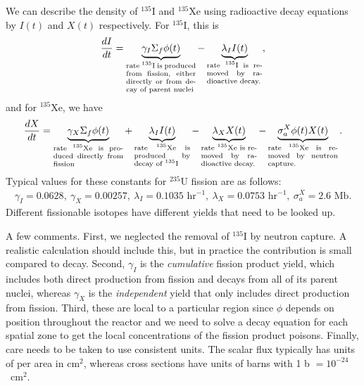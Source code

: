 We can describe the density of $^{135}$I and $^{135}$Xe using radioactive decay equations by $I(t)$ and $X(t)$ respectively. For $^{135}$I, this is
\begin{align}
  \frac{dI}{dt} = 
  \underbrace{\gamma_I \Sigma_f \phi(t)}_{\parbox{2.5cm}{\scriptsize rate $^{135}$I is produced from fission, either directly or from decay of parent nuclei}} 
  - \underbrace{\lambda_I I(t)}_{\parbox{2cm}{\scriptsize rate $^{135}$I is removed by radioactive decay.}}  ,
\end{align}
and for $^{135}$Xe, we have
\begin{align}
  \frac{dX}{dt} = 
  \underbrace{\gamma_X \Sigma_f \phi(t)}_{\parbox{2.5cm}{\scriptsize rate $^{135}$Xe is produced directly from fission}}
  + \underbrace{\lambda_I I(t)}_{\parbox{2cm}{\scriptsize rate $^{135}$Xe is produced by decay of $^{135}$I}}  
  - \underbrace{\lambda_X X(t)}_{\parbox{2cm}{\scriptsize rate $^{135}$Xe is removed by radioactive decay.}}  
  - \underbrace{\sigma_a^X \phi(t) X(t)}_{\parbox{2.5cm}{\scriptsize rate $^{135}$Xe is removed by neutron capture.}}.
\end{align}
Typical values for these constants for $^{235}$U fission are as follows:
\begin{align}
   \gamma_I = 0.0628, \ \gamma_X = 0.00257, \ \lambda_I = 0.1035 \text{ hr$^{-1}$}, \ \lambda_X = 0.0753 \text{ hr$^{-1}$}, \  \sigma_a^X = 2.6 \text{ Mb}. \nonumber
\end{align}
Different fissionable isotopes have different yields that need to be looked up.

A few comments. First, we neglected the removal of $^{135}$I by neutron capture. A realistic calculation should include this, but in practice the contribution is small compared to decay. Second, $\gamma_I$ is the \emph{cumulative} fission product yield, which includes both direct production from fission and decays from all of its parent nuclei, whereas $\gamma_X$ is the \emph{independent} yield that only includes direct production from fission. Third, these are local to a particular region since $\phi$ depends on position throughout the reactor and we need to solve a decay equation for each spatial zone to get the local concentrations of the fission product poisons. Finally, care needs to be taken to use consistent units. The scalar flux typically has units of per area in cm$^2$, whereas cross sections have units of barns with 1 b $ = 10^{-24}$~cm$^2$.


